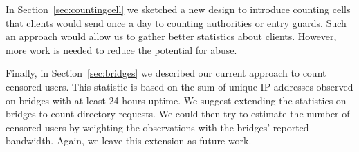 \documentclass{article}
\begin{document}
In Section~\ref{sec:countingcell} we sketched a new design to introduce
counting cells that clients would send once a day to counting authorities
or entry guards.
Such an approach would allow us to gather better statistics about clients.
However, more work is needed to reduce the potential for abuse.

Finally, in Section~\ref{sec:bridges} we described our current approach to
count censored users.
This statistic is based on the sum of unique IP addresses observed on
bridges with at least 24 hours uptime.
We suggest extending the statistics on bridges to count directory
requests.
We could then try to estimate the number of censored users by weighting
the observations with the bridges' reported bandwidth.
Again, we leave this extension as future work.
\end{document}
